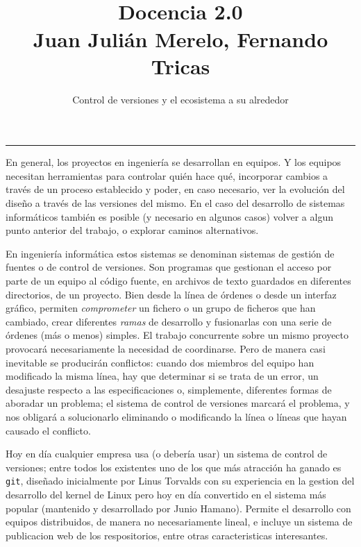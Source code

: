 \documentclass[twoside,10pt]{article}
\title{\ \\ Docencia 2.0\\ \large Juan Juli\'an Merelo, Fernando 
Tricas}
\author{\LARGE Control de versiones y el ecosistema a su alrededor}
\date{}
\newcounter{vol}
\begin{document}
\addtocounter{page}{2}

\maketitle
\vspace*{2ex}

\begin{multicols}{2}
\noindent\rule{86mm}{1pt}

En general, los proyectos en ingenier\'ia se desarrollan en equipos. Y los
equipos necesitan herramientas para controlar qui\'en hace qu\'e, incorporar
cambios a trav\'es de un proceso establecido y poder, en caso necesario,
ver la evoluci\'on del dise\~no a trav\'es de las versiones del mismo.
En el caso del desarrollo de sistemas inform\'aticos tambi\'en es posible (y
necesario en algunos casos) volver a algun punto anterior del trabajo, o explorar caminos alternativos.

En ingenier\'ia inform\'atica estos sistemas se denominan sistemas de
gesti\'on de fuentes o de control de versiones. Son programas que
gestionan el acceso por parte de un equipo al c\'odigo fuente, en
archivos de texto guardados en diferentes directorios, de un
proyecto. Bien desde la l\'inea de \'ordenes o desde un interfaz gr\'afico,
permiten  {\em comprometer} un fichero o un grupo de ficheros que han
cambiado, crear diferentes {\em ramas} de desarrollo y fusionarlas con
una serie de \'ordenes (m\'as o menos) simples. 
El trabajo concurrente sobre un mismo proyecto provocar\'a necesariamente la necesidad de coordinarse. Pero de manera casi inevitable se producir\'an conflictos:
cuando dos miembros del equipo han modificado la misma l\'inea, hay que
determinar si se trata de un error, un desajuste respecto a las
especificaciones o, simplemente, diferentes formas de aboradar un problema; el
sistema de control de versiones marcar\'a el problema, y nos obligar\'a a
solucionarlo eliminando o modificando la l\'inea o l\'ineas que hayan causado el
conflicto.

Hoy en d\'ia cualquier empresa usa (o deber\'ia usar) un sistema de control de
versiones; entre todos los existentes uno de los que m\'as atracci\'on ha ganado es
{\tt git}, dise\~nado inicialmente por Linus Torvalds con su experiencia en la
gestion del desarrollo del kernel de Linux pero hoy en d\'ia convertido en el
sistema m\'as popular (mantenido y desarrollado por Junio Hamano). 
Permite el desarrollo con equipos distribuidos, de manera no necesariamente
lineal, e incluye un sistema de publicacion web de los respositorios, entre
otras caracteristicas interesantes.


\end{multicols}
\end{document}
